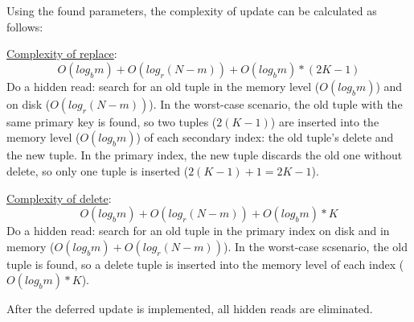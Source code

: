 \documentclass{vldb}
\begin{document}
Using the found parameters, the complexity of update can be calculated as follows:

\underline{Complexity of replace}:
\begin{displaymath}
O(log_bm) + O(log_r(N - m)) + O(log_bm) * (2K - 1)
\end{displaymath}
Do a hidden read: search for an old tuple in the memory level ($O(log_bm)$) and on
disk ($O(log_r(N - m))$). In the worst-case scenario, the old tuple with the same primary
key is found, so two tuples ($2(K - 1)$) are inserted into the memory level ($O(log_bm)$)
of each secondary index: the old tuple's delete and the new tuple. In the primary
index, the new tuple discards the old one without delete, so only one tuple is inserted
($2(K - 1) + 1 = 2K - 1$).

\underline{Complexity of delete}:
\begin{displaymath}
O(log_bm) + O(log_r(N - m)) + O(log_bm) * K
\end{displaymath}
Do a hidden read: search for an old tuple in the primary index on disk and in memory
($O(log_bm) + O(log_r(N - m))$). In the worst-case scsenario, the old tuple is found,
so a delete tuple is inserted into the memory level of each index ($O(log_bm) * K$).

After the deferred update is implemented, all hidden reads are eliminated.
\end{document}
